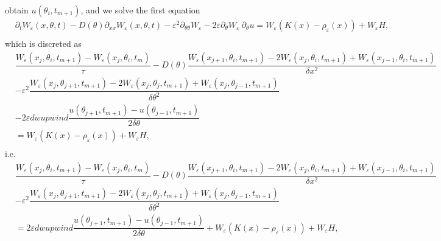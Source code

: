 \documentclass{article}
\begin{document}
obtain $u(\theta_i, t_{m+1})$, and we solve the first equation
\begin{equation}
\begin{aligned}
&\partial_t W_\varepsilon(x,\theta,t) - D(\theta)\partial_{xx} W_\varepsilon(x,\theta,t) -\varepsilon^2\partial_{\theta\theta} W_\varepsilon - 2\varepsilon\partial_{\theta} W_\varepsilon~ \partial_\theta u = W_\varepsilon (K(x)-\rho_\varepsilon(x)) + W_\varepsilon H,\\
\end{aligned}
\end{equation}
which is discreted as
 \begin{equation}
\begin{aligned}
&\dfrac{ W_\varepsilon(x_j, \theta_i, t_{m+1}) - W_\varepsilon(x_j, \theta_i, t_m)}{\tau}-D(\theta)\dfrac{W_\varepsilon(x_{j+1},\theta_i, t_{m+1}) - 2W_\varepsilon(x_j,\theta_i,t_{m+1}) + W_\varepsilon(x_{j-1}, \theta_i, t_{m+1})}{\delta x^2} \\
&-\varepsilon^2\dfrac{W_\varepsilon(x_j,\theta_{j+1},t_{m+1})-2W_\varepsilon(x_j,\theta_{j}, t_{m+1})+W_\varepsilon(x_j,\theta_{j-1}, t_{m+1})}{\delta\theta^2} \\
&- 2\varepsilon dwupwind\dfrac{u(\theta_{j+1},t_{m+1}) -u(\theta_{j-1},t_{m+1})}{2\delta\theta} \\
&= W_\varepsilon (K(x)-\rho_\varepsilon(x)) + W_\varepsilon H,\\
\end{aligned}
\end{equation}
i.e.
 \begin{equation}
\begin{aligned}
&\dfrac{ W_\varepsilon(x_j, \theta_i, t_{m+1}) - W_\varepsilon(x_j, \theta_i, t_m)}{\tau}-D(\theta)\dfrac{W_\varepsilon(x_{j+1},\theta_i, t_{m+1}) - 2W_\varepsilon(x_j,\theta_i,t_{m+1}) + W_\varepsilon(x_{j-1}, \theta_i, t_{m+1})}{\delta x^2} \\
&-\varepsilon^2\dfrac{W_\varepsilon(x_j,\theta_{j+1},t_{m+1})-2W_\varepsilon(x_j,\theta_{j}, t_{m+1})+W_\varepsilon(x_j,\theta_{j-1}, t_{m+1})}{\delta\theta^2} \\
&= 2\varepsilon dwupwind\dfrac{u(\theta_{j+1},t_{m+1}) -u(\theta_{j-1},t_{m+1})}{2\delta\theta}
+ W_\varepsilon (K(x)-\rho_\varepsilon(x)) + W_\varepsilon H,\\
\end{aligned}
\end{equation}
\end{document}
